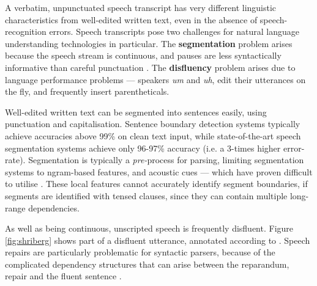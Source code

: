 \documentclass[11pt,letterpaper]{article}
\begin{document}
A verbatim, unpunctuated speech transcript has very different linguistic characteristics
from well-edited written text, even in the absence of speech-recognition errors.
Speech transcripts pose
two challenges for natural language understanding technologies in particular.
The \textbf{segmentation} problem arises because the speech stream is continuous,
and  pauses are less syntactically informative than careful punctuation \citep{gregory:04}.
The \textbf{disfluency} problem arises due to language performance problems ---
speakers \emph{um} and \emph{uh}, edit their utterances on the fly, and
frequently insert parentheticals.


Well-edited written text can be segmented into sentences easily, using punctuation and
capitalisation.  Sentence boundary detection systems typically achieve accuracies
above 99\% on clean text input, while state-of-the-art speech segmentation systems
achieve only 96-97\% accuracy (i.e. a 3-times higher error-rate).
Segmentation is typically a \emph{pre-}process for parsing, limiting segmentation
systems to ngram-based features, and acoustic cues --- which have proven difficult
to utilise \citep{liu:05}.  These local features cannot accurately identify
segment boundaries, if segments are identified with tensed clauses, since they can
contain multiple long-range dependencies.

As well as being continuous, unscripted speech is frequently disfluent.
Figure \ref{fig:shriberg} shows part of a disfluent utterance, annotated according to
\citet{shriberg:94}.
Speech repairs are particularly problematic for syntactic
parsers, because of the complicated dependency structures that can arise between the
reparandum, repair and the fluent sentence \citep{Johnson04a}.
\end{document}

